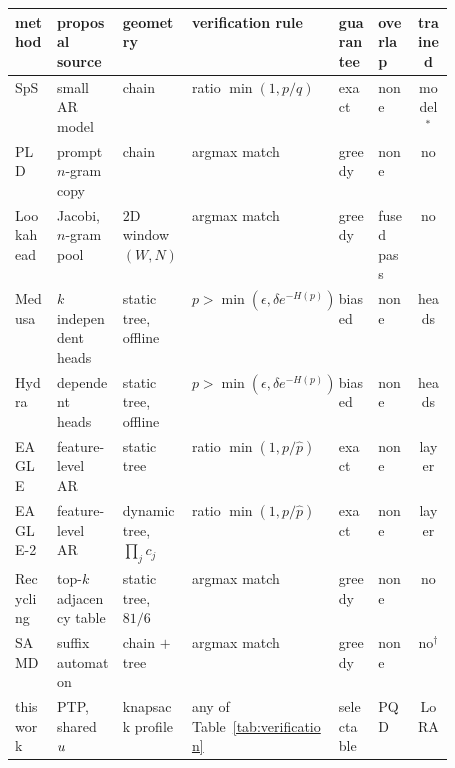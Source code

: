 {\setlength{\tabcolsep}{3pt}\footnotesize
\begin{tabular}{@{}l p{0.155\linewidth} p{0.15\linewidth} p{0.205\linewidth} l l c@{}}
\toprule
method & proposal source & geometry & verification rule & guarantee & overlap & trained \\
\midrule
SpS & small AR model & chain & ratio $\min(1, p/q)$ & exact & none & model$^\ast$ \\
PLD & prompt $n$-gram copy & chain & argmax match & greedy & none & no \\
Lookahead & Jacobi, $n$-gram pool & $2$D window $(W,N)$ & argmax match & greedy & fused pass & no \\
Medusa & $k$ independent heads & static tree, offline & $p > \min(\epsilon, \delta e^{-H(p)})$ & biased & none & heads \\
Hydra & dependent heads & static tree, offline & $p > \min(\epsilon, \delta e^{-H(p)})$ & biased & none & heads \\
EAGLE & feature-level AR & static tree & ratio $\min(1, p/\hat p)$ & exact & none & layer \\
EAGLE-2 & feature-level AR & dynamic tree, $\prod_j c_j$ & ratio $\min(1, p/\hat p)$ & exact & none & layer \\
Recycling & top-$k$ adjacency table & static tree, $81/6$ & argmax match & greedy & none & no \\
SAMD & suffix automaton & chain $+$ tree & argmax match & greedy & none & no$^\dagger$ \\
\midrule
this work & PTP, shared $u$ & knapsack profile & any of Table~\ref{tab:verification} & selectable & PQD & LoRA \\
\bottomrule
\end{tabular}}
